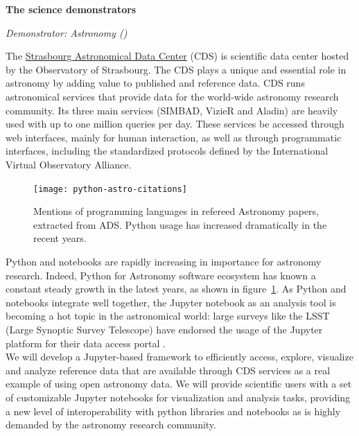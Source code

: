 \medskip
\textbf{The science demonstrators}\label{sec:science-demonstrators-in-concept}


\medskip

\emph{Demonstrator: Astronomy ()}\label{sec:concept-demonstrator-astronomy}

  The \href{http://cdsweb.u-strasbg.fr/}{Strasbourg Astronomical Data Center} (CDS) is scientific data
  center hosted by the Observatory of Strasbourg. The CDS plays a unique and
  essential role in astronomy by adding value to published and reference data.
  CDS runs astronomical services that
  provide data for the world-wide astronomy research community. Its three main
  services (SIMBAD, VizieR and Aladin) are heavily used with up to one million
  queries per day.  These services be accessed through web interfaces, mainly
  for human interaction, as well as through programmatic interfaces, including
  the standardized protocols defined by the International Virtual Observatory
  Alliance.

\begin{figure}[ht!]\centering
  \texttt{[image: python-astro-citations]}
  \caption{Mentions of programming languages in refereed Astronomy papers, extracted from ADS. Python usage has increased dramatically in the recent years.}\label{fig:python-astro-citations}
\end{figure}

  Python and notebooks are rapidly increasing in importance for astronomy
  research. Indeed, Python for Astronomy software ecosystem has known a
  constant steady growth in the latest years, as shown in
  figure~\ref{fig:python-astro-citations}. As Python and notebooks integrate
  well together, the Jupyter notebook as an analysis tool is becoming a hot
  topic in the astronomical world: large surveys like the LSST (Large Synoptic
  Survey Telescope) have endorsed the usage of the Jupyter platform for their
    data access portal \cite{lsst2017scienceplatform}.\\


  We will develop a Jupyter-based framework to efficiently access, explore,
  visualize and analyze reference data that are available through CDS services
  as a real example of using open astronomy data.
  We will provide scientific users with a set of customizable Jupyter notebooks
  for visualization and analysis tasks, providing a new level of
  interoperability with python libraries and notebooks as is highly demanded
  by the astronomy research community.

